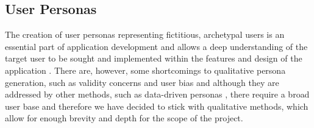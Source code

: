 \documentclass[12pt]{article}
\begin{document}
	\subsection{User Personas}
	The creation of user personas representing fictitious, archetypal users is an essential part of application development \cite{Grudin and Pruitt, 2002} and allows a deep understanding of the target user to be sought and implemented within the features and design of the application \cite{Long, 2009}. There are, however, some shortcomings to qualitative persona generation, such as validity concerns and user bias \cite{Chapman and Milham, 2007} and although they are addressed by other methods, such as data-driven personas \cite{Mcginn and Kotamraju, 2008}, there require a broad user base and therefore we have decided to stick with qualitative methods, which allow for enough brevity and depth for the scope of the project.
	
\end{document}
